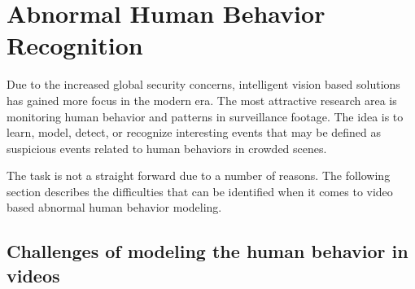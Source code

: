 \documentclass[a4paper,12pt]{report}
\begin{document}
  

\section{Abnormal Human Behavior Recognition}
Due to the increased global security concerns, intelligent vision based solutions has gained more focus in the modern era. The most attractive research area is monitoring human behavior and patterns in surveillance footage.  The idea is to learn, model, detect, or recognize interesting events that may be defined as suspicious events related to human behaviors in crowded scenes. 

The task is not a straight forward due to a number of reasons.  The following section describes the difficulties that can be identified when it comes to video based abnormal human behavior modeling.

\subsection{Challenges of modeling the human behavior in videos}
\end{document}
